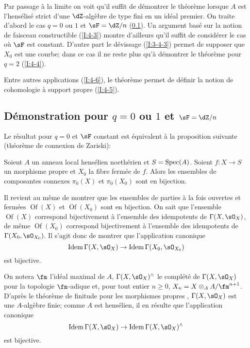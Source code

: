 Par passage à la limite on voit qu'il suffit de démontrer le théorème 
lorsque $A$ est l'hensélisé strict d'une $\dZ$-algèbre  de type fini en 
un idéal premier. On traite d'abord le cas $q=0$ ou $1$ et $\sF=\dZ/n$ 
(\ref{I:4-2}). Un argument basé sur la notion de faisceau constructible 
(\ref{I:4-3}) montre d'ailleurs qu'il suffit de considérer le cas où $\sF$ est 
constant. D'autre part le dévissage (\ref{I:3-4-3}) permet de supposer que 
$X_0$ est une courbe; dans ce cas il ne reste plus qu'à démontrer le 
théorème pour $q=2$ (\ref{I:4-4}). 

Entre autres applications (\ref{I:4-6}), le théorème permet de définir la notion 
de cohomologie à support propre (\ref{I:4-5}). 










\subsection{Démonstration pour \texorpdfstring{$q=0$}{q=1} ou \texorpdfstring{$1$}{1} et \texorpdfstring{$\sF=\dZ/n$}{\sF=Z/n}}\label{I:4-2} 

Le résultat pour $q=0$ et $\sF$ constant est équivalent à la proposition 
suivante (théorème de connexion de Zariski):





\begin{proposition}\label{I:4-2-1}
Soient $A$ un anneau local hensélien noethérien et $S=\operatorname{Spec}(A)$. 
Soient $f:X\to S$ un morphisme propre et $X_0$ la fibre fermée de $f$. Alors 
les ensembles de composantes connexes $\pi_0(X)$ et $\pi_0(X_0)$ sont en 
bijection.
\end{proposition}

Il revient au même de montrer que les ensembles de parties à la fois 
ouvertes et fermées $\operatorname{Of}(X)$ et $\operatorname{Of}(X_0)$ sont 
en bijection. On sait que l'ensemble $\operatorname{Of}(X)$ correspond 
bijectivement à l'ensemble des idempotents de $\Gamma(X,\sO_X)$, de même 
$\operatorname{Of}(X_0)$ correspond bijectivement à l'ensemble des 
idempotents de $\Gamma(X_0,\sO_{X_0})$. Il s'agit donc de montrer que 
l'application canonique 
\[
  \operatorname{Idem} \Gamma(X,\sO_X) \to \operatorname{Idem}\Gamma(X_0,\sO_{X_0})
\]
est bijective. 

On notera $\fm$ l'idéal maximal de $A$, $\Gamma(X,\sO_X)^\wedge$ le complété 
de $\Gamma(X,\sO_X)$ pour la topologie $\fm$-adique et, pour tout entier 
$n\geqslant 0$, $X_n=X\otimes_A A/\fm^{n+1}$. D'après le théorème de finitude 
pour les morphismes propres \cite[III.3.2]{ega}, $\Gamma(X,\sO_X)$ est une 
$A$-algèbre finie; comme $A$ est hensélien, il en résulte que 
l'application canonique 
\[
  \operatorname{Idem} \Gamma(X,\sO_X) \to \operatorname{Idem}\Gamma(X,\sO_X)^\wedge
\]
est bijective. 

